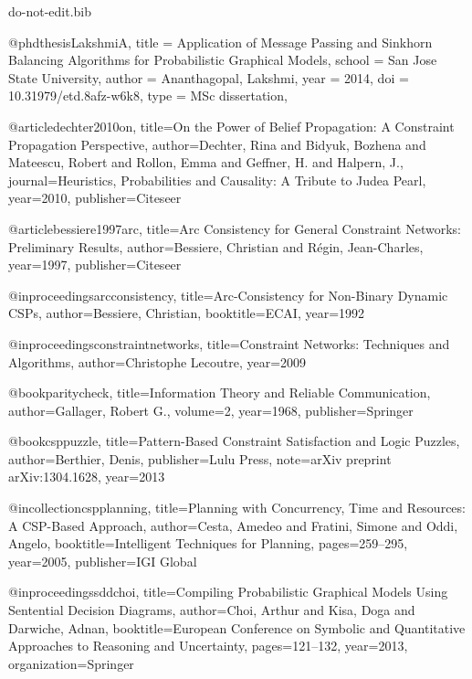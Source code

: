 \documentclass{ieeeaccess}
\begin{document}
{\begin{filecontents*}[overwrite]{do-not-edit.bib}
		
		@phdthesis{LakshmiA,
			title    = {Application of Message Passing and Sinkhorn Balancing Algorithms for Probabilistic Graphical Models},
			school   = {San Jose State University},
			author   = {Ananthagopal, Lakshmi},
			year     = {2014},
			doi      = {10.31979/etd.8afz-w6k8},
			type     = {{MSc} dissertation},
		}
		
		@article{dechter2010on,
			title={On the {P}ower of {B}elief {P}ropagation: {A} {C}onstraint {P}ropagation {P}erspective},
			author={Dechter, Rina and Bidyuk, Bozhena and Mateescu, Robert and Rollon, Emma and Geffner, H. and Halpern, J.},
			journal={Heuristics, Probabilities and Causality: A Tribute to Judea Pearl},
			year={2010},
			publisher={Citeseer}
		}
		
		@article{bessiere1997arc,
			title={Arc {C}onsistency for {G}eneral {C}onstraint {N}etworks: {P}reliminary {R}esults},
			author={Bessiere, Christian and R{\'e}gin, Jean-Charles},
			year={1997},
			publisher={Citeseer}
		}
		
		@inproceedings{arcconsistency,
			title={{A}rc-{C}onsistency for {N}on-{B}inary {D}ynamic {CSP}s},
			author={Bessiere, Christian},
			booktitle={ECAI},
			year={1992}
		}

		
		@inproceedings{constraintnetworks,
			title={Constraint Networks: Techniques and Algorithms},
			author={Christophe Lecoutre},
			year={2009}
		}
		
		@book{paritycheck,
			title={{I}nformation {T}heory and {R}eliable {C}ommunication},
			author={Gallager, Robert G.},
			volume={2},
			year={1968},
			publisher={Springer}
		}
		
		@book{csppuzzle,
			title={{P}attern-{B}ased {C}onstraint {S}atisfaction and {L}ogic {P}uzzles},
			author={Berthier, Denis},
			publisher={Lulu Press},
			note={arXiv preprint arXiv:1304.1628},
			year={2013}
		}
		
		@incollection{cspplanning,
			title={{P}lanning with {C}oncurrency, {T}ime and {R}esources: {A} {CSP}-{B}ased {A}pproach},
			author={Cesta, Amedeo and Fratini, Simone and Oddi, Angelo},
			booktitle={Intelligent Techniques for Planning},
			pages={259--295},
			year={2005},
			publisher={IGI Global}
		}
		
		@inproceedings{sddchoi,
			title={{C}ompiling {P}robabilistic {G}raphical {M}odels {U}sing {S}entential {D}ecision {D}iagrams},
			author={Choi, Arthur and Kisa, Doga and Darwiche, Adnan},
			booktitle={European Conference on Symbolic and Quantitative Approaches to Reasoning and Uncertainty},
			pages={121--132},
			year={2013},
			organization={Springer}
		}
		

\end{filecontents*}}
\end{document}
